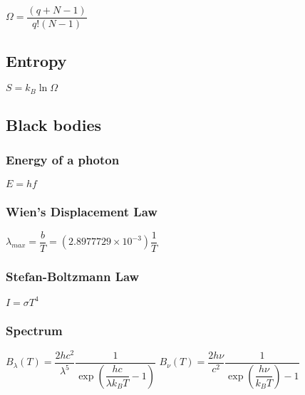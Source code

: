 \begin{itemize}
\itemt \( \Omega = \dfrac{(q+N-1)}{q!(N-1)} \)
\end{itemize}

\subsection{Entropy}

\begin{itemize}
\itemt \( S = k_B \ln \Omega \)
\end{itemize}


\subsection{Black bodies}

\subsubsection{Energy of a photon}
\begin{itemize}
\itemt \( E = hf \)
\end{itemize}

\subsubsection{Wien's Displacement Law}
\begin{itemize}
\itemt \( \lambda_{max} = \dfrac{b}{T} = (2.8977729\times10^{-3}) \dfrac{1}{T} \)
\end{itemize}

\subsubsection{Stefan-Boltzmann Law}
\begin{itemize}
\itemt \( I = \sigma T^4 \)
\end{itemize}

\subsubsection{Spectrum}
\begin{itemize}
\itemt \( B_\lambda (T) = \dfrac{2 h c^2}{\lambda^5} \dfrac{1}{\exp\left(\dfrac{h c}{\lambda k_B T} - 1\right)} \)
\itemt \( B_\nu (T) = \dfrac{2 h \nu}{c^2} \dfrac{1}{\exp\left(\dfrac{h \nu}{k_B T}\right) - 1} \)
\end{itemize}

